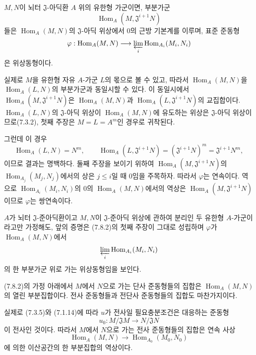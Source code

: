 \begin{proposition}[7.8.2]
\label{0.7.8.2-ko}
$M,N$이 뇌터 $\mathfrak J$-아딕환 $A$ 위의 유한형 가군이면,
부분가군
\[
  \operatorname{Hom}_A(M,\mathfrak J^{i+1}N)
\]
들은 $\operatorname{Hom}_A(M,N)$의 $\mathfrak J$-아딕 위상에서
$0$의 근방 기본계를 이루며, 표준 준동형
\[
  \varphi:\operatorname{Hom}_A(M,N)
  \longrightarrow
  \varprojlim_i\operatorname{Hom}_{A_i}(M_i,N_i)
\]
은 위상동형이다.
\end{proposition}

실제로 $M$을 유한형 자유 $A$-가군 $L$의 몫으로 볼 수 있고, 따라서
$\operatorname{Hom}_A(M,N)$을 $\operatorname{Hom}_A(L,N)$의
부분가군과 동일시할 수 있다. 이 동일시에서
$\operatorname{Hom}_A(M,\mathfrak J^{i+1}N)$은
$\operatorname{Hom}_A(M,N)$과
$\operatorname{Hom}_A(L,\mathfrak J^{i+1}N)$의 교집합이다.
$\operatorname{Hom}_A(L,N)$의 $\mathfrak J$-아딕 위상이
$\operatorname{Hom}_A(M,N)$에 유도하는 위상은
$\mathfrak J$-아딕 위상이므로(7.3.2), 첫째 주장은 $M=L=A^m$인 경우로
귀착된다.


그런데 이 경우
\[
  \operatorname{Hom}_A(L,N)=N^m,
  \qquad
  \operatorname{Hom}_A(L,\mathfrak J^{i+1}N)
  =(\mathfrak J^{i+1}N)^m
  =\mathfrak J^{i+1}N^m,
\]
이므로 결과는 명백하다. 둘째 주장을 보이기 위하여
$\operatorname{Hom}_A(M,\mathfrak J^{i+1}N)$의
$\operatorname{Hom}_{A_j}(M_j,N_j)$에서의 상은 $j\leq i$일 때
$0$임을 주목하자. 따라서 $\varphi$는 연속이다. 역으로
$\operatorname{Hom}_{A_i}(M_i,N_i)$의 $0$의
$\operatorname{Hom}_A(M,N)$에서의 역상은
$\operatorname{Hom}_A(M,\mathfrak J^{i+1}N)$이므로
$\varphi$는 쌍연속이다.

$A$가 뇌터 $\mathfrak J$-준아딕환이고 $M,N$이
$\mathfrak J$-준아딕 위상에 관하여 분리인 두 유한형 $A$-가군이라고만
가정해도, 앞의 증명은 (7.8.2)의 첫째 주장이 그대로 성립하며
$\varphi$가 $\operatorname{Hom}_A(M,N)$에서
\[
  \varprojlim_i\operatorname{Hom}_{A_i}(M_i,N_i)
\]
의 한 부분가군 위로 가는 위상동형임을 보인다.

\begin{proposition}[7.8.3]
\label{0.7.8.3-ko}
(7.8.2)의 가정 아래에서 $M$에서 $N$으로 가는 단사 준동형들의 집합은
$\operatorname{Hom}_A(M,N)$의 열린 부분집합이다. 전사 준동형들과
전단사 준동형들의 집합도 마찬가지이다.
\end{proposition}

실제로 (7.3.5)와 (7.1.14)에 따라 $u$가 전사일 필요충분조건은 대응하는
준동형
\[
  u_0:M/\mathfrak JM\longrightarrow N/\mathfrak JN
\]
이 전사인 것이다. 따라서 $M$에서 $N$으로 가는 전사 준동형들의
집합은 연속 사상
\[
  \operatorname{Hom}_A(M,N)
  \longrightarrow
  \operatorname{Hom}_{A_0}(M_0,N_0)
\]
에 의한 이산공간의 한 부분집합의 역상이다.

